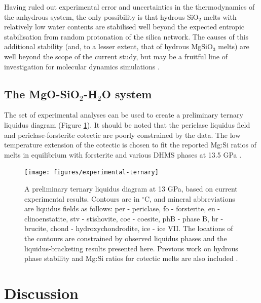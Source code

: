 \documentclass[review]{elsarticle}
\begin{document}
Having ruled out experimental error and uncertainties in the thermodynamics of the anhydrous system, the only possibility is that hydrous SiO$_2$ melts with relatively low water contents are stabilised well beyond the expected entropic stabilisation from random protonation of the silica network. The causes of this additional stability (and, to a lesser extent, that of hydrous MgSiO$_3$ melts) are well beyond the scope of the current study, but may be a fruitful line of investigation for molecular dynamics simulations \citep[e.g.][]{KS2010}.



\clearpage
\subsection{The MgO-SiO$_2$-H$_2$O system}
The set of experimental analyses can be used to create a preliminary ternary liquidus diagram (Figure \ref{fig:ternary}). It should be noted that the periclase liquidus field and periclase-forsterite cotectic are poorly constrained by the data. The low temperature extension of the cotectic is chosen to fit the reported Mg:Si ratios of melts in equilibrium with forsterite and various DHMS phases at 13.5 GPa \citep{MSUP2007}. 

 
\begin{figure}[ht!]
  \centering
      \texttt{[image: figures/experimental-ternary]}
  \caption{A preliminary ternary liquidus diagram at 13 GPa, based on current experimental results. Contours are in $^{\circ}$C, and mineral abbreviations are liquidus fields as follows: per - periclase, fo - forsterite, en - clinoenstatite, stv - stishovite, coe - coesite, phB - phase B, br - brucite, chond - hydroxychondrodite, ice - ice VII. The locations of the contours are constrained by observed liquidus phases and the liquidus-bracketing results presented here. Previous work on hydrous phase stability and Mg:Si ratios for cotectic melts are also included \citep{MSUP2007}.}
  \label{fig:ternary}
\end{figure}


\section{Discussion}
\end{document}
